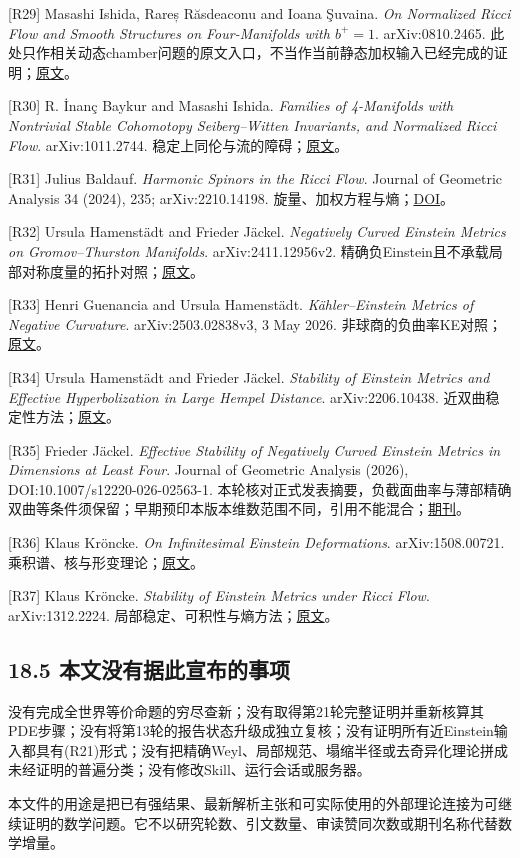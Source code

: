 \documentclass[
  11pt,
  a4paper,
  fontset=none]{ctexart}
\begin{document}
{[}R29{]} Masashi Ishida, Rareș Răsdeaconu and Ioana Şuvaina. \emph{On
Normalized Ricci Flow and Smooth Structures on Four-Manifolds with
\(b^+=1\)}. arXiv:0810.2465.
此处只作相关动态chamber问题的原文入口，不当作当前静态加权输入已经完成的证明；\href{https://arxiv.org/abs/0810.2465}{原文}。

{[}R30{]} R. İnanç Baykur and Masashi Ishida. \emph{Families of
4-Manifolds with Nontrivial Stable Cohomotopy Seiberg--Witten
Invariants, and Normalized Ricci Flow}. arXiv:1011.2744.
稳定上同伦与流的障碍；\href{https://arxiv.org/abs/1011.2744}{原文}。

{[}R31{]} Julius Baldauf. \emph{Harmonic Spinors in the Ricci Flow}.
Journal of Geometric Analysis 34 (2024), 235; arXiv:2210.14198.
旋量、加权方程与熵；\href{https://doi.org/10.1007/s12220-024-01665-y}{DOI}。

{[}R32{]} Ursula Hamenstädt and Frieder Jäckel. \emph{Negatively Curved
Einstein Metrics on Gromov--Thurston Manifolds}. arXiv:2411.12956v2.
精确负Einstein且不承载局部对称度量的拓扑对照；\href{https://arxiv.org/abs/2411.12956}{原文}。

{[}R33{]} Henri Guenancia and Ursula Hamenstädt. \emph{Kähler--Einstein
Metrics of Negative Curvature}. arXiv:2503.02838v3, 3 May 2026.
非球商的负曲率KE对照；\href{https://arxiv.org/abs/2503.02838}{原文}。

{[}R34{]} Ursula Hamenstädt and Frieder Jäckel. \emph{Stability of
Einstein Metrics and Effective Hyperbolization in Large Hempel
Distance}. arXiv:2206.10438.
近双曲稳定性方法；\href{https://arxiv.org/abs/2206.10438}{原文}。

{[}R35{]} Frieder Jäckel. \emph{Effective Stability of Negatively Curved
Einstein Metrics in Dimensions at Least Four}. Journal of Geometric
Analysis (2026), DOI:10.1007/s12220-026-02563-1.
本轮核对正式发表摘要，负截面曲率与薄部精确双曲等条件须保留；早期预印本版本维数范围不同，引用不能混合；\href{https://doi.org/10.1007/s12220-026-02563-1}{期刊}。

{[}R36{]} Klaus Kröncke. \emph{On Infinitesimal Einstein Deformations}.
arXiv:1508.00721.
乘积谱、核与形变理论；\href{https://arxiv.org/abs/1508.00721}{原文}。

{[}R37{]} Klaus Kröncke. \emph{Stability of Einstein Metrics under Ricci
Flow}. arXiv:1312.2224.
局部稳定、可积性与熵方法；\href{https://arxiv.org/abs/1312.2224}{原文}。

\subsection{18.5
本文没有据此宣布的事项}\label{ux672cux6587ux6ca1ux6709ux636eux6b64ux5ba3ux5e03ux7684ux4e8bux9879}

没有完成全世界等价命题的穷尽查新；没有取得第21轮完整证明并重新核算其PDE步骤；没有将第13轮的报告状态升级成独立复核；没有证明所有近Einstein输入都具有(R21)形式；没有把精确Weyl、局部规范、塌缩半径或去奇异化理论拼成未经证明的普遍分类；没有修改Skill、运行会话或服务器。

本文件的用途是把已有强结果、最新解析主张和可实际使用的外部理论连接为可继续证明的数学问题。它不以研究轮数、引文数量、审读赞同次数或期刊名称代替数学增量。
\end{document}

